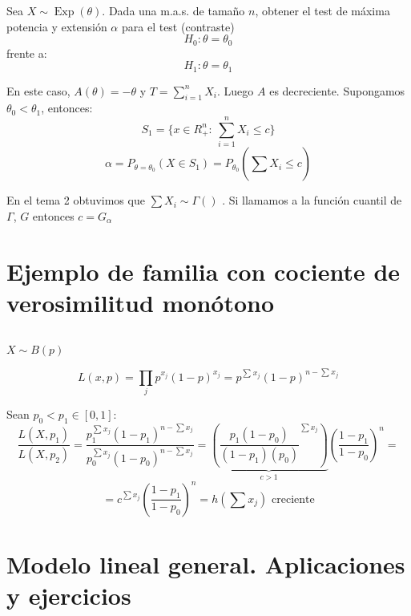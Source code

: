 \documentclass[openany]{book}
\begin{document}
\begin{example}
    Sea $ X \sim \operatorname{Exp}(\theta) $. Dada una m.a.s. de tamaño $ n $, obtener el test de máxima potencia y extensión $ \alpha $ para el test (contraste)
        $$ H_0: \theta = \theta_0 $$
    frente a:
    $$ H_1: \theta = \theta_1 $$
    
    En este caso, $ A(\theta) = -\theta $ y $ T = \sum\limits_{i=1}^{n}X_i $. Luego $ A $ es decreciente. Supongamos $ \theta_0<\theta_1 $, entonces:
    $$ S_1 = \{x \in R_{+}^{n}:\ \sum\limits_{i=1}^{n} X_i\leq  c\} $$
    $$ \alpha = P_{\theta=\theta_0}(X \in S_1) = P_{\theta_0}\left(\sum\limits_{}^{}X_i \leq  c\right)  $$

    En el tema 2 obtuvimos que $ \sum X_i \sim \Gamma() $ . Si llamamos a la función cuantil de $ \Gamma $, $ G $ entonces $ c = G_{\alpha} $
    
\end{example}

\section{Ejemplo de familia con cociente de verosimilitud monótono}

\begin{example}
    $ $

    $ X \sim B(p)$

    $$ L(x,p) = \prod_{j}^{} p^{x_j} (1-p)^{x_j} = p^{\sum\limits_{}^{}x_j} (1-p)^{n-\sum\limits_{}^{}x_j} $$

    Sean $ p_0<p_1 \in [0,1]$:
    $$ \dfrac{L(X,p_1)}{L(X,p_2)} = \dfrac{p_1^{\sum\limits_{}^{}x_j}(1-p_1)^{n-\sum x_j}}{p_0^{\sum x_j}(1-p_0)^{n-\sum x_j}} = \underbrace{\left( \dfrac{p_1(1-p_0)}{(1-p_1)(p_0)}^{\sum x_j} \right)}_{c>1} \left( \dfrac{1-p_1}{1-p_0} \right)^{n} = $$  
    $$=c ^{\sum x_j} \left( \dfrac{1-p_1}{1-p_0} \right)^{n} = h(\sum x_j) \text{ creciente} $$
\end{example}

\newpage
\section{Modelo lineal general. Aplicaciones y ejercicios}
\end{document}
